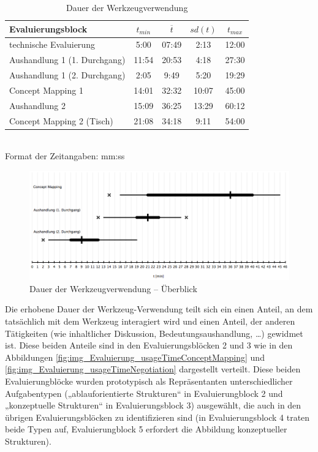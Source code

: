 \begin{table}[htbp]
	\centering
	\caption{Dauer der Werkzeugverwendung}
		\begin{tabular}{| l || c | c | c | c |}
		\hline
			Evaluierungsblock & $t_{min}$ & $\overline{t}$ & $sd(t)$ & $t_{max}$ \\ \hline
			technische Evaluierung		  &  5:00 & 07:49 &  2:13 & 12:00 \\
			Aushandlung 1 (1. Durchgang)  & 11:54 & 20:53 &  4:18 & 27:30 \\
			Aushandlung 1 (2. Durchgang)  &  2:05 &  9:49 &  5:20 & 19:29 \\
			Concept Mapping 1			  & 14:01 & 32:32 & 10:07 & 45:00 \\
			Aushandlung 2				  & 15:09 & 36:25 & 13:29 & 60:12 \\
			Concept Mapping 2 (Tisch)     & 21:08 & 34:18 &  9:11 & 54:00 \\  \hline
	\end{tabular} \\
	\footnotesize Format der Zeitangaben: mm:ss
	\label{tab:dauer_werkzeugverwendung}
\end{table}


\begin{figure}[htbp]
	\centering
		\includegraphics[width=15cm]{img/Evaluierung/usageTimeOverview.png}
	\caption{Dauer der Werkzeugverwendung -- Überblick}
	\label{fig:img_Evaluierung_usageTimeOverview}
\end{figure}

Die erhobene Dauer der Werkzeug-Verwendung teilt sich ein einen Anteil, an dem tatsächlich mit dem Werkzeug interagiert wird und einen Anteil, der anderen Tätigkeiten (wie inhaltlicher Diskussion, Bedeutungsaushandlung, \ldots) gewidmet ist. Diese beiden Anteile sind in den Evaluierungsblöcken 2 und 3 wie in den Abbildungen \ref{fig:img_Evaluierung_usageTimeConceptMapping} und \ref{fig:img_Evaluierung_usageTimeNegotiation} dargestellt verteilt. Diese beiden Evaluierungblöcke wurden prototypisch als Repräsentanten unterschiedlicher Aufgabentypen („ablauforientierte Strukturen“ in Evaluierungblock 2 und „konzeptuelle Strukturen“ in Evaluierungsblock 3) ausgewählt, die auch in den übrigen Evaluierungsblöcken zu identifizieren sind (in Evaluierungsblock 4 traten beide Typen auf, Evaluierungblock 5 erfordert die Abbildung konzeptueller Strukturen).


